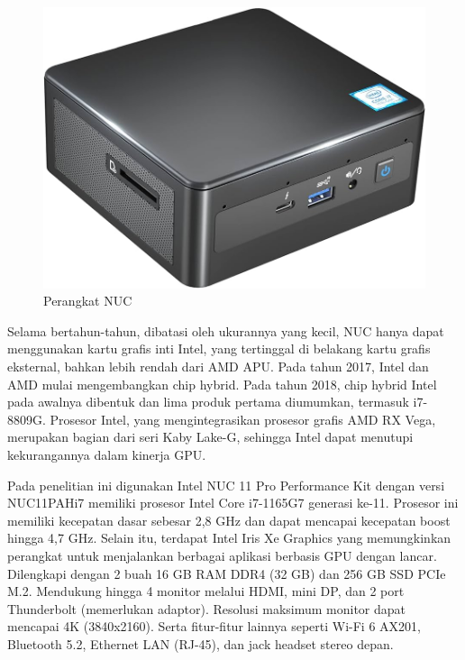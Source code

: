 \begin{figure} [ht] \centering
    \includegraphics[scale=0.2]{gambar/nuc.jpg}
    \caption{Perangkat NUC}
    \label{fig:Perangkat NUC}
\end{figure}

Selama bertahun-tahun, dibatasi oleh ukurannya yang kecil, NUC hanya dapat menggunakan kartu grafis inti Intel, yang tertinggal di belakang kartu grafis eksternal, bahkan lebih rendah dari AMD APU. Pada tahun 2017, Intel dan AMD mulai mengembangkan chip hybrid. Pada tahun 2018, chip hybrid Intel pada awalnya dibentuk dan lima produk pertama diumumkan, termasuk i7-8809G. Prosesor Intel, yang mengintegrasikan prosesor grafis AMD RX Vega, merupakan bagian dari seri Kaby Lake-G, sehingga Intel dapat menutupi kekurangannya dalam kinerja GPU\parencite{8858650}.

Pada penelitian ini digunakan Intel NUC 11 Pro Performance Kit dengan versi NUC11PAHi7 memiliki prosesor Intel Core i7-1165G7 generasi ke-11. Prosesor ini memiliki kecepatan dasar sebesar 2,8 GHz dan dapat mencapai kecepatan boost hingga 4,7 GHz. Selain itu, terdapat Intel Iris Xe Graphics yang memungkinkan perangkat untuk menjalankan berbagai aplikasi berbasis GPU dengan lancar. Dilengkapi dengan 2 buah 16 GB RAM DDR4 (32 GB) dan 256 GB SSD PCIe M.2. Mendukung hingga 4 monitor melalui HDMI, mini DP, dan 2 port Thunderbolt (memerlukan adaptor). Resolusi maksimum monitor dapat mencapai 4K (3840x2160). Serta fitur-fitur lainnya seperti Wi-Fi 6 AX201, Bluetooth 5.2, Ethernet LAN (RJ-45), dan jack headset stereo depan.